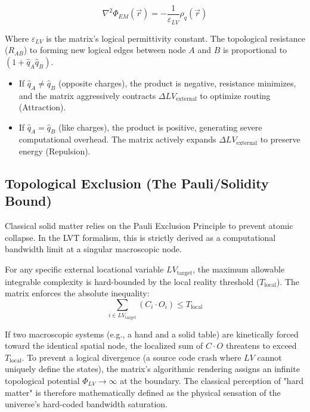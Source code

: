 \documentclass[12pt,a4paper]{article}
\begin{document}
\begin{equation}\label{eq:Phi_EM}
\nabla^2 \Phi_{EM}(\vec{r}) = - \frac{1}{\varepsilon_{LV}} \rho_q(\vec{r})
\end{equation}

Where $\varepsilon_{LV}$ is the matrix's logical permittivity constant. The topological resistance ($R_{AB}$) to forming new logical edges between node $A$ and $B$ is proportional to $(1 + \hat{q}_A \hat{q}_B)$. 
\begin{itemize}
    \item If $\hat{q}_A \neq \hat{q}_B$ (opposite charges), the product is negative, resistance minimizes, and the matrix aggressively contracts $\Delta LV_{\mathrm{external}}$ to optimize routing (Attraction).
    \item If $\hat{q}_A = \hat{q}_B$ (like charges), the product is positive, generating severe computational overhead. The matrix actively expands $\Delta LV_{\mathrm{external}}$ to preserve energy (Repulsion).
\end{itemize}

\subsection{Topological Exclusion (The Pauli/Solidity Bound)}
Classical solid matter relies on the Pauli Exclusion Principle to prevent atomic collapse. In the LVT formalism, this is strictly derived as a computational bandwidth limit at a singular macroscopic node.

For any specific external locational variable $LV_{\mathrm{target}}$, the maximum allowable integrable complexity is hard-bounded by the local reality threshold ($T_{\mathrm{local}}$). The matrix enforces the absolute inequality:
\begin{equation}\label{eq:Pauli_Bound}
\sum_{i \in LV_{\mathrm{target}}} \left( C_i \cdot O_i \right) \leq T_{\mathrm{local}}
\end{equation}

If two macroscopic systems (e.g., a hand and a solid table) are kinetically forced toward the identical spatial node, the localized sum of $C \cdot O$ threatens to exceed $T_{\mathrm{local}}$. To prevent a logical divergence (a source code crash where $LV$ cannot uniquely define the states), the matrix's algorithmic rendering assigns an infinite topological potential $\Phi_{LV} \to \infty$ at the boundary. The classical perception of "hard matter" is therefore mathematically defined as the physical sensation of the universe's hard-coded bandwidth saturation.
\end{document}
